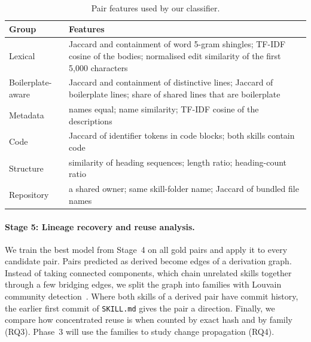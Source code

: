 \begin{table}[t]
\caption{Pair features used by our classifier.}
\label{tab:features}
\small
\begin{tabular}{>{\raggedright\arraybackslash}p{}>{\raggedright\arraybackslash}p{}}
\toprule
Group & Features \\
\midrule
Lexical & Jaccard and containment of word 5-gram shingles; TF-IDF cosine of the bodies;
normalised edit similarity of the first 5,000 characters \\
Boilerplate-aware & Jaccard and containment of distinctive lines; Jaccard of boilerplate
lines; share of shared lines that are boilerplate \\
Metadata & names equal; name similarity; TF-IDF cosine of the descriptions \\
Code & Jaccard of identifier tokens in code blocks; both skills contain code \\
Structure & similarity of heading sequences; length ratio; heading-count ratio \\
Repository & a shared owner; same skill-folder name; Jaccard of bundled file names \\
\bottomrule
\end{tabular}
\end{table}

\paragraph{Stage 5: Lineage recovery and reuse analysis.} We train the best model from
Stage~4 on all gold pairs and apply it to every candidate pair. Pairs predicted as derived
become edges of a derivation graph. Instead of taking connected components, which chain
unrelated skills together through a few bridging edges, we split the graph into families with
Louvain community detection~\cite{blondel2008louvain}. Where both skills of a derived pair have
commit history, the earlier first commit of \texttt{SKILL.md} gives the pair a direction.
Finally, we compare how concentrated reuse is when counted by exact hash and by family (RQ3).
Phase~3 will use the families to study change propagation (RQ4).
